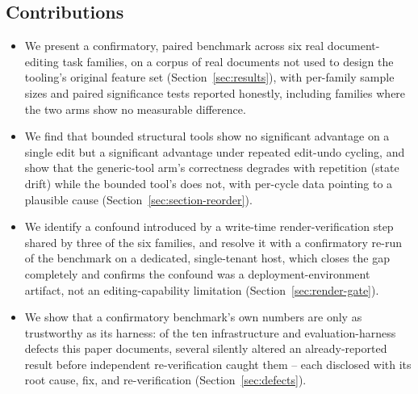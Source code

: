 \documentclass[11pt]{article}
\DeclareRobustCommand{\claim}[2]{#2}
\begin{document}
\subsection{Contributions}

\begin{itemize}
\item \claim{six-task-families}{We present a confirmatory, paired benchmark across six real document-editing task
  families,} \claim{primary-corpus-holdout-status}{on a corpus of real documents not used to design the tooling's
  original feature set}
  (Section~\ref{sec:results}), \claim{report-every-comparison}{with per-family sample sizes and paired significance tests
  reported honestly, including families where the two arms show no measurable difference.}
\item \claim{section-reorder-k1-directional-not-significant}{\claim{single-edit-no-advantage}{We find that bounded structural tools show no significant advantage on a single edit}} \claim{k4-significant-advantage}{but a
  significant advantage under repeated edit-undo cycling,} \claim{fresh-anchor-resolution-mechanism}{\claim{state-drift-generic-degrades}{and show that the
  generic-tool arm's correctness degrades with repetition (state drift) while the bounded
  tool's does not, with per-cycle data pointing to a plausible cause}} (Section~\ref{sec:section-reorder}).
\item \claim{verification-confound-reliability-cost}{We identify a confound introduced by a write-time render-verification step shared by
  \claim{six-task-families}{three of the six families}}, and \claim{rerun-is-direct-test}{\claim{rerun-identical-benchmark-dedicated-host}{resolve it with a confirmatory re-run of the
  benchmark on a dedicated, single-tenant host},} \claim{rerun-closed-gap-completely}{which closes the gap completely} and
  \claim{gap-was-deployment-artifact}{confirms the confound was a deployment-environment artifact, not an editing-capability
  limitation} (Section~\ref{sec:render-gate}).
\item We show that a confirmatory benchmark's own numbers are only as trustworthy as its
  harness: \claim{defects-all-fixed-status}{\claim{ten-defects-count}{of the ten infrastructure and evaluation-harness defects this paper
  documents,} \claim{defects-materially-changed-numbers}{several silently altered an already-reported result before independent
  re-verification caught them} -- \claim{defect-fixes-reverified}{\claim{defects-disclosed-in-full}{each disclosed with its root cause, fix, and re-verification}}}
  (Section~\ref{sec:defects}).
\end{itemize}
\end{document}

